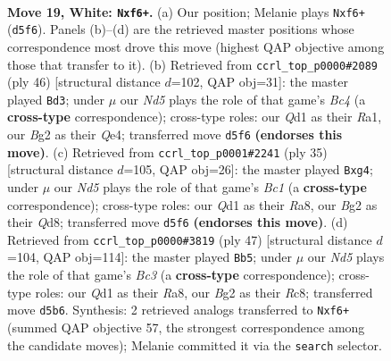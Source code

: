 \documentclass[11pt]{article}
\begin{document}
\clearpage

\begin{figure}[p]\centering
\begin{subfigure}{0.46\textwidth}\centering
\resizebox{\linewidth}{!}{%
\newchessgame
\chessboard[
  setfen={rnbqk3/8/5n2/ppbN1pr1/8/6P1/PP2PPB1/R2QNRK1 w q - 0 19},
  showmover=false,
  pgfstyle=straightmove, color=movearrow, markmove={d5-f6}
]}
\caption{}
\end{subfigure}\hfill
\begin{subfigure}{0.46\textwidth}\centering
\resizebox{\linewidth}{!}{%
\newchessgame
\chessboard[
  setfen={1rq4k/6pp/3p4/1b1N1rb1/p1B1Q3/7P/1P3PP1/R4RK1 w - - 0 24},
  showmover=false,
  pgfstyle=straightmove, color=movearrow, markmove={c4-d3}
]}
\caption{}
\end{subfigure}
\\[4pt]
\begin{subfigure}{0.46\textwidth}\centering
\resizebox{\linewidth}{!}{%
\newchessgame
\chessboard[
  setfen={r1bq1rk1/pp3pbp/3p4/8/3n2BP/3N2P1/PP1B4/R2Q1R1K b - - 0 18},
  showmover=false,
  pgfstyle=straightmove, color=movearrow, markmove={c8-g4}
]}
\caption{}
\end{subfigure}\hfill
\begin{subfigure}{0.46\textwidth}\centering
\resizebox{\linewidth}{!}{%
\newchessgame
\chessboard[
  setfen={r1r3k1/1q1npp1p/p1b3p1/Q7/NP6/2R1P3/4BPPP/3R2K1 b - - 0 24},
  showmover=false,
  pgfstyle=straightmove, color=movearrow, markmove={c6-b5}
]}
\caption{}
\end{subfigure}
\caption{\textbf{Move 19, White: \texttt{Nxf6+}.} (a) Our position; Melanie plays \texttt{Nxf6+} (\texttt{d5f6}). Panels (b)--(d) are the retrieved master positions whose correspondence most drove this move (highest QAP objective among those that transfer to it). (b) Retrieved from \texttt{ccrl\_top\_p0000\#2089} (ply 46) [structural distance $d$=102, QAP obj=31]: the master played \texttt{Bd3}; under $\mu$ our \emph{Nd5} plays the role of that game's \emph{Bc4} (a \textbf{cross-type} correspondence); cross-type roles: our \emph{Q}d1 as their \emph{R}a1, our \emph{B}g2 as their \emph{Q}e4; transferred move \texttt{d5f6} \textbf{(endorses this move)}. (c) Retrieved from \texttt{ccrl\_top\_p0001\#2241} (ply 35) [structural distance $d$=105, QAP obj=26]: the master played \texttt{Bxg4}; under $\mu$ our \emph{Nd5} plays the role of that game's \emph{Bc1} (a \textbf{cross-type} correspondence); cross-type roles: our \emph{Q}d1 as their \emph{R}a8, our \emph{B}g2 as their \emph{Q}d8; transferred move \texttt{d5f6} \textbf{(endorses this move)}. (d) Retrieved from \texttt{ccrl\_top\_p0000\#3819} (ply 47) [structural distance $d$=104, QAP obj=114]: the master played \texttt{Bb5}; under $\mu$ our \emph{Nd5} plays the role of that game's \emph{Bc3} (a \textbf{cross-type} correspondence); cross-type roles: our \emph{Q}d1 as their \emph{R}a8, our \emph{B}g2 as their \emph{R}c8; transferred move \texttt{d5b6}. Synthesis: 2 retrieved analogs transferred to \texttt{Nxf6+} (summed QAP objective 57, the strongest correspondence among the candidate moves); Melanie committed it via the \texttt{search} selector.}
\label{fig:thought-m36}
\end{figure}
\end{document}
